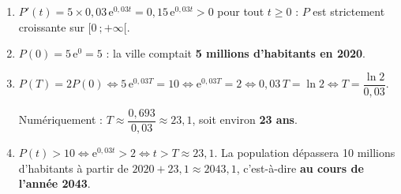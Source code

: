 \documentclass[11pt]{article}
\newcommand{\cle}[1]{{\popxbold\color{popdark}#1}}
\begin{document}
\begin{corrige}
\begin{enumerate}
\item $P'(t) = 5 \times 0{,}03\,\mathrm{e}^{0{,}03t} = 0{,}15\,\mathrm{e}^{0{,}03t} > 0$ pour tout $t \geq 0$ : $P$ est \cle{strictement croissante} sur $[0\ ; +\infty[$.
\item $P(0) = 5\,\mathrm{e}^0 = 5$ : la ville comptait \textbf{5 millions d'habitants en 2020}.
\item $P(T) = 2P(0) \iff 5\,\mathrm{e}^{0{,}03T} = 10 \iff \mathrm{e}^{0{,}03T} = 2 \iff 0{,}03\,T = \ln 2 \iff T = \dfrac{\ln 2}{0{,}03}$.

Numériquement : $T \approx \dfrac{0{,}693}{0{,}03} \approx 23{,}1$, soit environ \textbf{23 ans}.
\item $P(t) > 10 \iff \mathrm{e}^{0{,}03t} > 2 \iff t > T \approx 23{,}1$. La population dépassera 10 millions d'habitants à partir de $2020 + 23{,}1 \approx 2043{,}1$, c'est-à-dire \textbf{au cours de l'année 2043}.
\end{enumerate}
\end{corrige}
\end{document}
